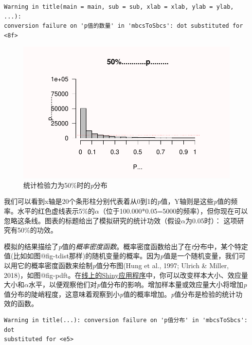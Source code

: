 \documentclass[
  letterpaper,
  DIV=11,
  numbers=noendperiod]{scrreprt}
\begin{document}
\begin{verbatim}
Warning in title(main = main, sub = sub, xlab = xlab, ylab = ylab, ...):
conversion failure on 'p值的数量' in 'mbcsToSbcs': dot substituted for <8f>
\end{verbatim}

\begin{figure}

{\centering \includegraphics[width=1\textwidth,height=\textheight]{01-pvalue_files/figure-pdf/fig-pdistr1-1.pdf}

}

\caption{\label{fig-pdistr1}统计检验力为50\%时的\emph{p}分布}

\end{figure}

我们可以看到x轴是20个条形柱分别代表着从0到1的\emph{p}值，Y轴则是这些\emph{p}值的频率。水平的红色虚线表示5\%的\(\alpha\)（位于100.000*0.05=5000的频率），但你现在可以忽略这条线。图表的标题给出了模拟研究的统计功效（假设\(\alpha\)为0.05时）：
这项研究有50\%的功效。

模拟的结果描绘了\emph{p}值的\emph{概率密度函数}。概率密度函数给出了在\emph{t}分布中，某个特定值(比如如图@fig-tdist那样)的随机变量的概率。因为\emph{p}值是一个随机变量，我们可以用它的概率密度函数来绘制\emph{p}值分布图(Hung
et al., 1997; Ulrich \& Miller,
2018)，如图@fig-pdft。在\href{http://shiny.ieis.tue.nl/d_p_power/}{线上的Shiny应用程序}中，你可以改变样本大小、效应量大小和\(\alpha\)水平，以便观察他们对\emph{p}值分布的影响。增加样本量或效应量大小将增加\emph{p}值分布的陡峭程度，这意味着观察到小\emph{p}值的概率增加。\emph{p}值分布是检验的统计功效的函数。

\begin{verbatim}
Warning in title(...): conversion failure on 'p值分布' in 'mbcsToSbcs': dot
substituted for <e5>
\end{verbatim}
\end{document}
